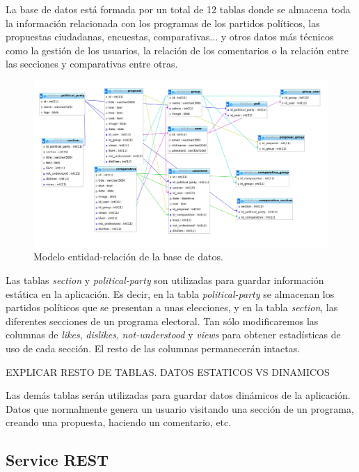La base de datos está formada por un total de 12 tablas donde se almacena toda la información relacionada con los programas de los partidos políticos, las propuestas ciudadanas, encuestas, comparativas... y otros datos más técnicos como la gestión de los usuarios, la relación de los comentarios o la relación entre las secciones y comparativas entre otras.

\begin{figure}[H]
\centering
\includegraphics[keepaspectratio, scale=0.30]{Media/Captures/database.png}
\caption{Modelo entidad-relación de la base de datos.}
\label{fig:ermodel}
\end{figure}

Las tablas \textit{section} y \textit{political-party} son utilizadas para guardar información estática en la aplicación. Es decir, en la tabla \textit{political-party} se almacenan los partidos políticos que se presentan a unas elecciones, y en la tabla \textit{section}, las diferentes secciones de un programa electoral. Tan sólo modificaremos las columnas de \textit{likes}, \textit{dislikes}, \textit{not-understood} y \textit{views} para obtener estadísticas de uso de cada sección. El resto de las columnas permanecerán intactas.

EXPLICAR RESTO DE TABLAS. DATOS ESTATICOS VS DINAMICOS

Las demás tablas serán utilizadas para guardar datos dinámicos de la aplicación. Datos que normalmente genera un usuario visitando una sección de un programa, creando una propuesta, haciendo un comentario, etc.

\subsection{Service REST} \label{ssec:seviceREST}

